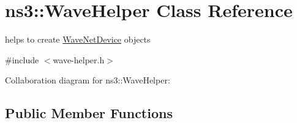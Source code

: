 \hypertarget{classns3_1_1WaveHelper}{}\section{ns3\+:\+:Wave\+Helper Class Reference}
\label{classns3_1_1WaveHelper}


helps to create \hyperlink{classns3_1_1WaveNetDevice}{Wave\+Net\+Device} objects  




{\ttfamily \#include $<$wave-\/helper.\+h$>$}



Collaboration diagram for ns3\+:\+:Wave\+Helper\+:
\subsection*{Public Member Functions}
